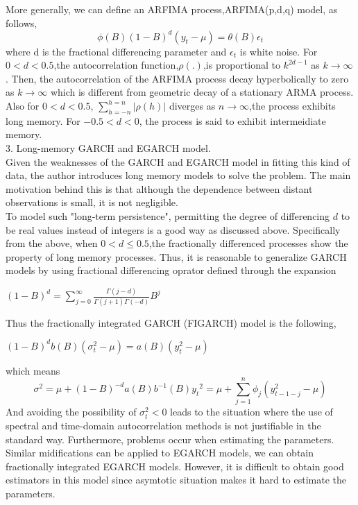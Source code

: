 \documentclass[10pt,a4paper]{article}
\begin{document}
 More generally, we can define an ARFIMA process,ARFIMA(p,d,q) model, as follows,
$$\phi(B)(1-B)^d(y_t-\mu)=\theta(B)\epsilon_t$$
where d is the fractional differencing parameter and $\epsilon_t$ is white noise. For $0<d<0.5$,the autocorrelation function,$\rho(.)$,is proportional to $k^{2d-1}$ as $k\rightarrow\infty$. Then, the autocorrelation of the ARFIMA process decay hyperbolically to zero as $k\rightarrow\infty$ which is different from geometric decay of a stationary ARMA process. Also for $0<d<0.5$, $\sum_{h=-n}^{h=n} |\rho(h)|$ diverges as $n\rightarrow \infty$,the process exhibits long memory. For $-0.5<d<0$, the process is said to exhibit intermeidiate memory.  \\

3. Long-memory GARCH and EGARCH model.\\

Given the weaknesses of the GARCH and EGARCH model in fitting this kind of data, the author introduces long memory models to solve the problem. The main motivation behind this is that although the dependence between distant observations is small, it is not negligible.\\
  To model such "long-term persistence", permitting the degree of differencing $d$ to be real values instead of integers is a good way as discussed above. Specifically from the above, when $0<d\leq 0.5$,the fractionally differenced processes show the property of long memory processes. Thus, it is reasonable to generalize GARCH models by using fractional differencing oprator defined through the expansion

\begin{center}$\displaystyle (1-B)^d=\sum_{j=0}^{\infty}\frac{\Gamma(j-d)}{\Gamma(j+1)\Gamma(-d)}B^j $\end{center}

Thus the fractionally integrated GARCH (FIGARCH) model is the following,

\begin{center}$\displaystyle (1-B)^db(B)(\sigma^2_t-\mu)=a(B)(y^2_t-\mu) $\end{center}
which means
$$\sigma^2=\mu+(1-B)^{-d}a(B)b^{-1}(B){y_t}^2=\mu+\sum_{j=1}^{n}\phi_j(y_{t-1-j}^2-\mu)$$
And avoiding the possibility of $\sigma_t^2<0$ leads to the situation where the use of spectral and time-domain autocorrelation methods is not justifiable in the standard way. Furthermore, problems occur when estimating the parameters.\\
Similar midifications can be applied to EGARCH models, we can obtain fractionally integrated EGARCH models. However, it is difficult to obtain good estimators in this model since asymtotic situation makes it hard to estimate the parameters.\\
\end{document}
